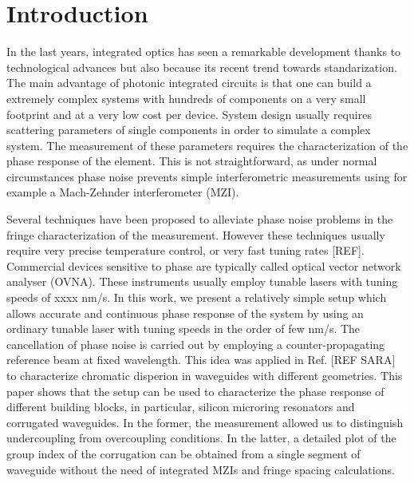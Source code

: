 \documentclass[journal]{IEEEtran}
\begin{document}
\section{Introduction}

In the last years, integrated optics has seen a remarkable development thanks to technological advances but also because its recent trend towards standarization.
The main advantage of photonic integrated circuits is that one can build a extremely complex systems with hundreds of components on a very small footprint and at a very low cost per device.
System design usually requires scattering parameters of single components in order to simulate a complex system.
The measurement of these parameters requires the characterization of the phase response of the element.
This is not straightforward, as under normal circumstances phase noise prevents simple interferometric measurements using for example a Mach-Zehnder interferometer (MZI).

Several techniques have been proposed to alleviate phase noise problems in the fringe characterization of the measurement.
However these techniques usually require very precise temperature control, or very fast tuning rates [REF].
Commercial devices sensitive to phase are typically called optical vector network analyser (OVNA).
These instruments usually employ tunable lasers with tuning speeds of xxxx nm/s.
In this work, we present a relatively simple setup which allows accurate and continuous phase response of the system by using an ordinary tunable laser with tuning speeds in the order of few nm/s. The cancellation of phase noise is carried out by employing a counter-propagating reference beam at fixed wavelength.
This idea was applied in Ref. [REF SARA] to characterize chromatic disperion in waveguides with different geometries.
This paper shows that the setup can be used to characterize the phase response of different building blocks, in particular, silicon microring resonators and corrugated waveguides. In the former, the measurement allowed us to distinguish undercoupling from overcoupling conditions.
In the latter, a detailed plot of the group index of the corrugation can be obtained from a single segment of waveguide without the need of integrated MZIs and fringe spacing calculations.
\end{document}
